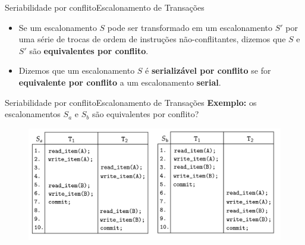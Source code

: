 \documentclass[t]{beamer}
\begin{document}

\begin{ftst}{Seriabilidade por conflito}{Escalonamento de Transações}

\begin{itemize}
    \item Se um escalonamento $S$ pode ser transformado em um escalonamento $S'$ por uma série de trocas de ordem de instruções não-conflitantes, dizemos que $S$ e $S'$ são \textbf{equivalentes por conflito}.
    \item Dizemos que um escalonamento $S$ é \textbf{serializável por conflito} se for \textbf{equivalente por conflito} a um escalonamento \textbf{serial}.

\end{itemize}

\end{ftst}


\begin{ftst}{Seriabilidade por conflito}{Escalonamento de Transações}
\textbf{Exemplo:} os escalonamentos $S_a$ e $S_b$ são equivalentes por conflito?

\begin{figure}
    \centering
    \includegraphics[scale=0.13]{Figuras_transacoes/15.png}
\end{figure}

\end{ftst}

\end{document}
